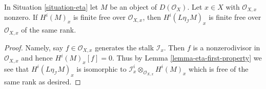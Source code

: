 \begin{lemma}
\label{lemma-eta-cohomology-locally-free}
In Situation \ref{situation-eta} let $M$ be an object of $D(\mathcal{O}_X)$.
Let $x \in X$ with $\mathcal{O}_{X, x}$ nonzero. If $H^i(M)_x$
is finite free over $\mathcal{O}_{X, x}$, then $H^i(L\eta_\mathcal{I}M)_x$
is finite free over $\mathcal{O}_{X, x}$ of the same rank.
\end{lemma}

\begin{proof}
Namely, say $f \in \mathcal{O}_{X, x}$ generates the stalk $\mathcal{I}_x$.
Then $f$ is a nonzerodivisor in $\mathcal{O}_{X, x}$ and hence
$H^i(M)_x[f] = 0$. Thus by
Lemma \ref{lemma-eta-first-property}
we see that $H^i(L\eta_\mathcal{I}M)_x$
is isomorphic to
$\mathcal{I}^i_x \otimes_{\mathcal{O}_{X, x}} H^i(M)_x$
which is free of the same rank as desired.
\end{proof}















